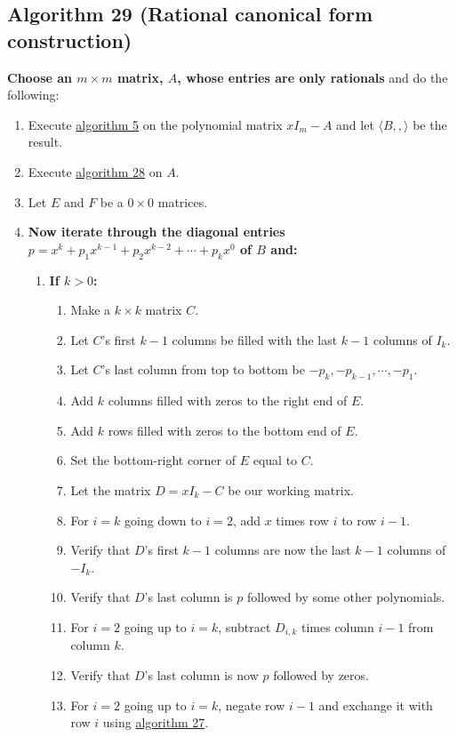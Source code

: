 \documentclass[twocolumn]{article}
\begin{document}
		\subsection{Algorithm 29 (Rational canonical form construction)}
			\textbf{Choose an $m\times m$ matrix, $A$, whose entries are only rationals} and do the following:
			\begin{enumerate}
				\item Execute \hyperref[sec:algorithm 5]{algorithm 5} on the polynomial matrix $xI_m-A$ and let $\langle B,,\rangle$ be the result.
				\item Execute \hyperref[sec:algorithm 28]{algorithm 28} on $A$.
				\item Let $E$ and $F$ be a $0\times 0$ matrices.
				\item \textbf{Now iterate through the diagonal entries $p=x^k+p_1x^{k-1}+p_2x^{k-2}+\cdots+p_kx^0$ of $B$ and:}
				\begin{enumerate}
					\item \textbf{If $k>0$:}
					\begin{enumerate}
						\item Make a $k\times k$ matrix $C$.
						\item Let $C$'s first $k-1$ columns be filled with the last $k-1$ columns of $I_k$.
						\item Let $C$'s last column from top to bottom be $-p_k, -p_{k-1},\cdots,-p_1$.
						\item Add $k$ columns filled with zeros to the right end of $E$.
						\item Add $k$ rows filled with zeros to the bottom end of $E$.
						\item Set the bottom-right corner of $E$ equal to $C$.
						\item Let the matrix $D=xI_k-C$ be our working matrix.
						\item For $i=k$ going down to $i=2$, add $x$ times row $i$ to row $i-1$.
						\item Verify that $D$'s first $k-1$ columns are now the last $k-1$ columns of $-I_k$.
						\item Verify that $D$'s last column is $p$ followed by some other polynomials.
						\item For $i=2$ going up to $i=k$, subtract $D_{i, k}$ times column $i-1$ from column $k$.
						\item Verify that $D$'s last column is now $p$ followed by zeros.
						\item For $i=2$ going up to $i=k$, negate row $i-1$ and exchange it with row $i$ using \hyperref[sec:algorithm 27]{algorithm 27}.

\end{enumerate}
\end{enumerate}
\end{enumerate}
\end{document}
